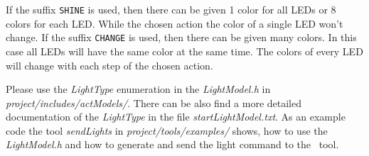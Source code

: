 \bigskip

If the suffix {\tt SHINE} is used, then there can be given 1 color for all LEDs or 8 colors for each LED. While the chosen action the color of a single LED won't change. If the suffix {\tt CHANGE} is used, then there can be given many colors. In this case all LEDs will have the same color at the same time. The colors of every LED will change with each step of the chosen action.

Please use the {\it LightType} enumeration in the {\it LightModel.h} in {\it project/includes/actModels/}. There can be also find a more detailed documentation of the {\it LightType} in the file {\it startLightModel.txt}. As an example code the tool {\it sendLights} in {\it project/tools/examples/} shows, how to use the {\it LightModel.h} and how to generate and send the light command to the \setlightsnameI\ tool.

